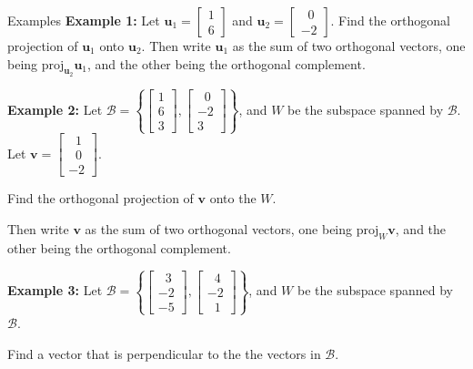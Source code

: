 \documentclass[10pt, aspectratio=169]{beamer}
\begin{document}
\begin{frame}{Examples}
\textbf{Example 1:}
Let \(\mathbf{u}_1 =\begin{bmatrix} 1 \\ 6 \end{bmatrix}\) and 
\(\mathbf{u}_2 =\begin{bmatrix} \;\;0 \\-2 \end{bmatrix}\). 
Find the orthogonal projection of \(\mathbf{u}_1\) onto \(\mathbf{u}_2\).
Then write \(\mathbf{u}_1\) as the sum of two orthogonal vectors, one being \(\text{proj}_{\mathbf{u}_2} \mathbf{u}_1\), and the other being the orthogonal complement.

\vspace{0.25cm}

\textbf{Example 2:}
Let \(\mathcal{B} =\left\{\begin{bmatrix} 1 \\ 6 \\ 3\end{bmatrix}, \begin{bmatrix} \;\;0 \\-2\\3 \end{bmatrix} \right\}\), and \(W\) be the subspace spanned by \(\mathcal{B}\).
Let \(\mathbf{v} = \begin{bmatrix} \;\;1\\\;\;0 \\-2 \end{bmatrix}\).

Find the orthogonal projection of  \(\mathbf{v}\) onto the \(W\).

Then write \(\mathbf{v}\) as the sum of two orthogonal vectors, one being \(\text{proj}_{W} \mathbf{v}\), and the other being the orthogonal complement.

\vspace{0.25cm}

\textbf{Example 3:}
Let \(\mathcal{B} =\left\{\begin{bmatrix} \;\;3 \\ -2 \\ -5\end{bmatrix}, \begin{bmatrix} \;\;4 \\-2\\\;\;1 \end{bmatrix} \right\}\), and \(W\) be the subspace spanned by \(\mathcal{B}\).

Find a vector that is perpendicular to the the vectors in \(\mathcal{B}\).
\end{frame}
\end{document}
